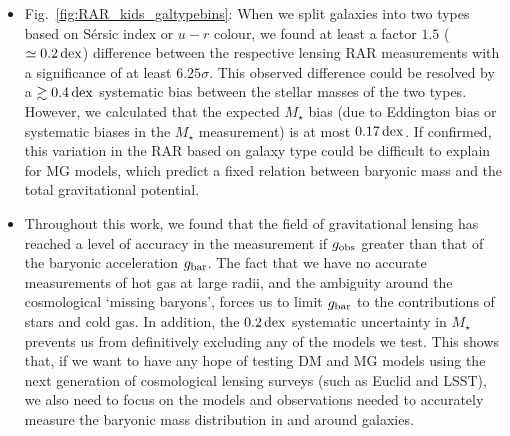 \documentclass[usenatbib]{mnras}
\newcommand{\un}[1]{_{\rm #1}}
\newcommand{\dex}{\, {\rm dex}}
\begin{document}
\begin{itemize}
	\item Fig.~\ref{fig:RAR_kids_galtypebins}: When we split galaxies into two types based on S\'ersic index or $u-r$ colour, we found at least a factor $1.5$ ($\simeq0.2 \dex$) difference between the respective lensing RAR measurements with a significance of at least $6.25 \sigma$. This observed difference could be resolved by a $\gtrsim 0.4 \dex$ systematic bias between the stellar masses of the two types. However, we calculated that the expected $M_\star$ bias (due to Eddington bias or systematic biases in the $M_\star$ measurement) is at most $0.17 \dex$. If confirmed, this variation in the RAR based on galaxy type could be difficult to explain for MG models, which predict a fixed relation between baryonic mass and the total gravitational potential.
	
	\item Throughout this work, we found that the field of gravitational lensing has reached a level of accuracy in the measurement if $g\un{obs}$ greater than that of the baryonic acceleration $g\un{bar}$. The fact that we have no accurate measurements of hot gas at large radii, and the ambiguity around the cosmological `missing baryons', forces us to limit $g\un{bar}$ to the contributions of stars and cold gas. In addition, the $0.2 \dex$ systematic uncertainty in $M_\star$ prevents us from definitively excluding any of the models we test. This shows that, if we want to have any hope of testing DM and MG models using the next generation of cosmological lensing surveys (such as Euclid and LSST), we also need to focus on the models and observations needed to accurately measure the baryonic mass distribution in and around galaxies.
	
\end{itemize}
\end{document}

